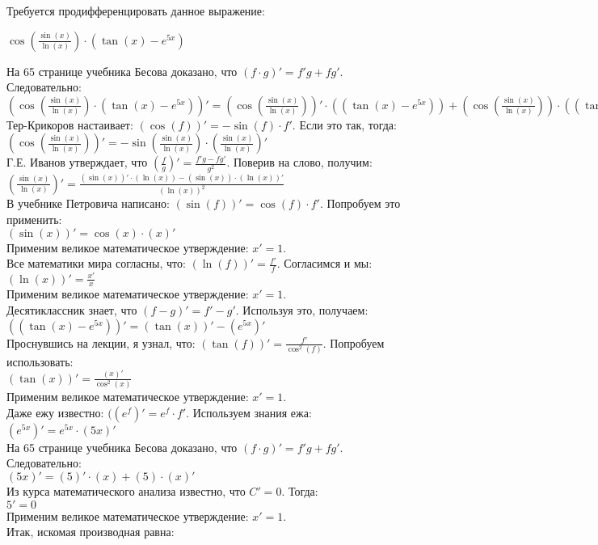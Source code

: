 \documentclass[12pt]{article}
\begin{document}
Требуется продифференцировать данное выражение: 

$ \cos (\frac{\sin (x) } {\ln (x)} ) \cdot (\tan (x)  - e^{5x}) $

На 65 странице учебника Бесова доказано, что $(f \cdot g)' = f'g + fg' $. Следовательно: \\ 
 $(\cos (\frac{\sin (x) } {\ln (x)} ) \cdot (\tan (x)  - e^{5x}) )' =  (\cos (\frac{\sin (x) } {\ln (x)} ) )' \cdot ((\tan (x)  - e^{5x}) ) + (\cos (\frac{\sin (x) } {\ln (x)} ) ) \cdot ((\tan (x)  - e^{5x}) )'$ \\ 
 Тер-Крикоров настаивает: $(\cos(f))' = -\sin(f) \cdot f' $. Если это так, тогда: \\ 
 $(\cos (\frac{\sin (x) } {\ln (x)} ) )' =  -\sin(\frac{\sin (x) } {\ln (x)} ) \cdot (\frac{\sin (x) } {\ln (x)} )' $ \\ 
Г.Е. Иванов утверждает, что $(\frac{f}{g})' = \frac{f'g - fg'}{g^2} $. Поверив на слово, получим: \\ 
 $(\frac{\sin (x) } {\ln (x)} )' =  \frac{(\sin (x) )' \cdot (\ln (x)) - (\sin (x) ) \cdot (\ln (x))'}{(\ln (x))^2}$ \\ 
 В учебнике Петровича написано: $(\sin(f))' = \cos(f) \cdot f' $. Попробуем это применить: \\ 
 $(\sin (x) )' =  \cos(x) \cdot (x)' $ \\ 
Применим великое математическое утверждение: $x' = 1$.  \\ 
Все математики мира согласны, что: $(\ln(f))' = \frac{f'}{f} $. Согласимся и мы: \\ 
 $(\ln (x))' =  \frac{x'}{x} $ \\ 
Применим великое математическое утверждение: $x' = 1$.  \\ 
Десятиклассник знает, что $(f - g)' = f' - g' $. Используя это, получаем: \\ 
 $((\tan (x)  - e^{5x}) )' = (\tan (x) )' - (e^{5x})'$ \\ 
Проснувшись на лекции, я узнал, что: $(\tan(f))' = \frac{f'}{\cos^2(f)} $. Попробуем использовать: \\ 
 $(\tan (x) )' =  \frac{(x)'}{\cos^2(x)} $ \\ 
Применим великое математическое утверждение: $x' = 1$.  \\ 
Даже ежу известно: $((e^{f})' = e^{f} \cdot f'$. Используем знания ежа: \\ 
 $(e^{5x})' =  e^{5x} \cdot (5x)' $ \\ 
На 65 странице учебника Бесова доказано, что $(f \cdot g)' = f'g + fg' $. Следовательно: \\ 
 $(5x)' =  (5)' \cdot (x) + (5) \cdot (x)'$ \\ 
 Из курса математического анализа известно, что $C' = 0$. Тогда: \\ 
 $5' = 0$ \\ 
Применим великое математическое утверждение: $x' = 1$.  \\ 
Итак, искомая производная равна: 
\end{document}
